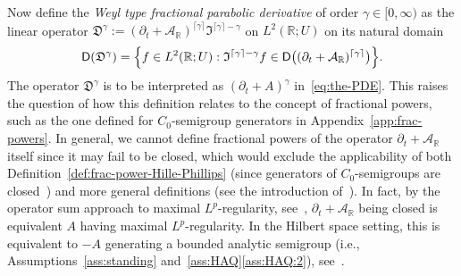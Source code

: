 \documentclass[reqno]{amsart}
\numberwithin{equation}{section}
\newcommand{\bbR}{\mathbb{R}}
\newcommand{\R}{\mathbb{R}}
\newcommand{\cA}{\mathcal{A}}
\newcommand{\dom}[1]{\mathsf D(#1)}
\theoremstyle{remark}
\theoremstyle{definition}
\begin{document}
Now define the
\emph{Weyl type fractional parabolic derivative} of order $\gamma \in [0,\infty)$ 
as the linear operator
%
$
\mathfrak D^\gamma := (\partial_t + \cA_\R)^{\lceil \gamma \rceil} \mathfrak I^{\lceil \gamma \rceil - \gamma}
$
%
on $L^2(\R; U)$ on its natural domain
%
\[
\dom{\mathfrak D^\gamma}
=
\Bigl\{
f \in L^2(\R; U)
:
\mathfrak I^{\lceil \gamma \rceil - \gamma} f
\in 
\mathsf D \bigl({(\partial_t + \cA_\bbR)^{\lceil \gamma \rceil}}\bigr)
\Bigr\}.
\]
%
The operator $\mathfrak D^\gamma$
is to be interpreted as $(\partial_t + A)^\gamma$ in~\eqref{eq:the-PDE}.
This raises the question of how this definition relates
to the concept of fractional powers, 
such as the one defined for $C_0$-semigroup generators in Appendix~\ref{app:frac-powers}.
In general, we cannot define fractional powers
of the operator $\partial_t + \cA_\R$ itself since it may fail to be closed,
which would exclude the applicability of both Definition~\ref{def:frac-power-Hille-Phillips}
(since generators of $C_0$-semigroups are closed~\cite[Chapter~1, Corollary~2.5]{Pazy1983}) 
and more general definitions
(see the introduction of~\cite{MartinezCarracedo2001}).
In fact, by the operator sum approach to maximal $L^p$-regularity, see~\cite[Discussion~1.18]{KunstmannWeis2004},
$\partial_t + \cA_\bbR$ being closed is equivalent $A$ having maximal $L^p$-regularity.
In the Hilbert space setting, this is equivalent to $-A$ generating a bounded analytic semigroup
(i.e., Assumptions~\ref{ass:standing} and~\ref{ass:HAQ}\ref{ass:HAQ:2}), see~\cite[Corollary~1.7]{KunstmannWeis2004}.
\end{document}
